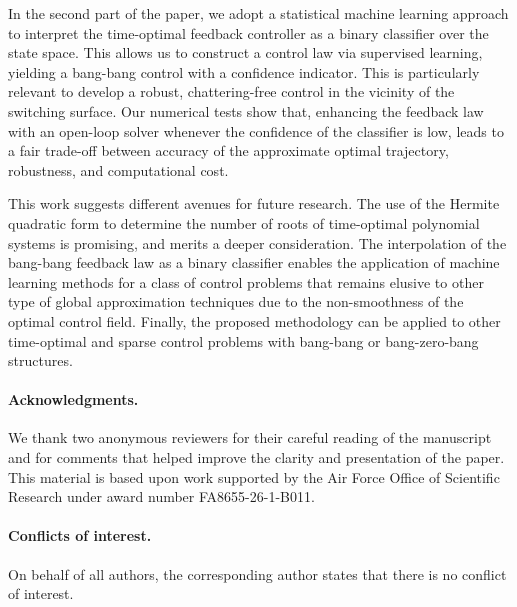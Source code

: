 \documentclass[11pt]{amsart}
\theoremstyle{definition}
\theoremstyle{remark}
\numberwithin{equation}{section}
\begin{document}
In the second part of the paper, we adopt a statistical machine learning approach to interpret the time-optimal feedback controller as a binary classifier over the state space. This allows us to construct a control law via supervised learning, yielding a bang-bang control with a confidence indicator. This is particularly relevant to develop a robust, chattering-free control in the vicinity of the switching surface.  Our numerical tests show that, enhancing the feedback law with an open-loop solver whenever the confidence of the classifier is low, leads to a fair trade-off between accuracy of the approximate optimal trajectory, robustness, and computational cost. 

This work suggests different avenues for future research. The use of the Hermite quadratic form to determine the number of roots of time-optimal polynomial systems is promising, and merits a deeper consideration. The interpolation of the bang-bang feedback law as a binary classifier enables the application of machine learning methods for a class of control problems that remains elusive to other type of global approximation techniques due to the non-smoothness of the optimal control field. Finally, the proposed methodology can be applied to other time-optimal and sparse control problems with bang-bang or bang-zero-bang structures. 

\paragraph{\bf Acknowledgments.} We thank two anonymous reviewers for their careful reading of the manuscript and for comments that helped improve the clarity and presentation of the paper. This material is based upon work supported by the Air Force Office of Scientific Research under award number FA8655-26-1-B011.

\paragraph{\bf Conflicts of interest.} On behalf of all authors, the corresponding author states that there is no conflict of interest.



\end{document}
